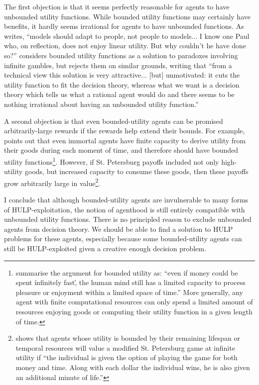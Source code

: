 \documentclass{article}
\begin{document}
The first objection is that it seems perfectly reasonable for agents to have unbounded utility functions. While bounded utility functions may certainly have benefits, it hardly seems irrational for agents to have unbounded functions. As \citep{samuelson1977st} writes, ``models should adapt to people, not people to models... I know one Paul who, on reflection, does not enjoy linear utility. But why couldn't he have done so?'' \citep{smith2014evaluative} considers bounded utility functions as a solution to paradoxes involving infinite gambles, but rejects them on similar grounds, writing that ``from a technical view this solution is very attractive... [but] unmotivated: it cuts the utility function to fit the decision theory, whereas what we want is a decision theory which tells us what a rational agent would do \textemdash{} and there seems to be nothing irrational about having an unbounded utility function.''

A second objection is that even bounded-utility agents can be promised arbitrarily-large rewards if the rewards help extend their bounds. For example, \citep{brito1975becker} points out that even immortal agents have finite capacity to derive utility from their goods during each moment of time, and therefore should have bounded utility functions\footnote{\citep{cowen1988time} summarise the argument for bounded utility as: ``even if money could be spent \'infinitely fast\', the human mind still has a limited capacity to process pleasure or enjoyment within a limited space of time.'' More generally, any agent with finite computational resources can only spend a limited amount of resources enjoying goods or computing their utility function in a given length of time.}. However, if St. Petersburg payoffs included not only high-utility goods, but increased capacity to consume these goods, then these payoffs grow arbitrarily large in value\footnote{\citep{cowen1988time} shows that agents whose utility is bounded by their remaining lifespan or temporal resources will value a modified St. Petersburg game at infinite utility if ``the individual is given the option of playing the game for both money and time. Along with each dollar the individual wins, he is also given an additional minute of life.''}. 

I conclude that although bounded-utility agents are invulnerable to many forms of HULP-exploitation, the notion of agenthood is still entirely compatible with unbounded utility functions. There is no principled reason to exclude unbounded agents from decision theory. We should be able to find a solution to HULP problems for these agents, especially because some bounded-utility agents can still be HULP-exploited given a creative enough decision problem.
\end{document}
